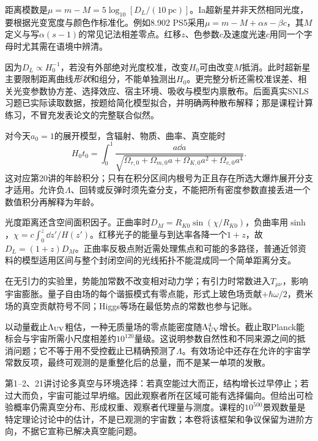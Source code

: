 距离模数是$\mu=m-M=5\log_{10}[D_L/(10\ \mathrm{pc})]$。Ia超新星并非天然相同光度，要根据光变宽度与颜色作标准化。例如8.902 PS5采用$\mu=m-M+\alpha s-\beta c$，其$M$定义与写$\alpha(s-1)$的常见记法相差零点。红移$z$、色参数$c$及速度光速$c$用同一个字母时尤其需在语境中辨清。

因为$D_L\propto H_0^{-1}$，若没有外部绝对光度校准，改变$H_0$可由改变$M$抵消。此时超新星主要限制距离曲线\emph{形状}和组分，不能单独测出$H_0$。更完整分析还需校准误差、相关光变参数协方差、选择效应、宿主环境、吸收与模型内禀散布。后面真实SNLS习题已实际读取数据，按题给简化模型拟合，并明确两种散布解释；那是课程计算练习，不冒充发表论文的完整联合似然。

对今天$a_0=1$的展开模型，含辐射、物质、曲率、真空能时
\[
 H_0t_0=\int_0^1\frac{a\dd a}
 {\sqrt{\Omega_{r,0}+\Omega_{m,0}a+\Omega_{K,0}a^2+\Omega_{v,0}a^4}}.
\]
这对应第20讲的年龄积分；只有在积分区间内根号为正且存在所选大爆炸展开分支才适用。允许负$\Lambda$、回转或反弹时须先查分支，不能把所有密度参数直接丢进一个数值积分再解释为年龄。

光度距离还含空间面积因子。正曲率时$D_M=R_{K0}\sin(\chi/R_{K0})$，负曲率用$\sinh$，$\chi=c\int_0^z\dd z'/H(z')$。红移光子的能量与到达率各降一个$1+z$，故$D_L=(1+z)D_M$。正曲率反极点附近需处理焦点和可能的多路径，普通近邻资料的模型适用区间与整个封闭空间的光线拓扑不能混成同一个简单距离分支。

在无引力的实验里，势能加常数不改变相对动力学；有引力时常数进入$T_{\mu\nu}$，影响宇宙膨胀。量子自由场的每个谐振模式有零点能，形式上玻色场贡献$+\hbar\omega/2$，费米场的真空贡献符号不同；Higgs等场在最低势点的常数也参与记账。

以动量截止$\Lambda_{\rm UV}$粗估，一种无质量场的零点能密度随$\Lambda_{\rm UV}^4$增长。截止取Planck能标会与宇宙所需小尺度相差约$10^{120}$量级。这说明参数自然性和不同来源之间的抵消问题；它不等于用不受控截止已精确预测了$\Lambda$。有效场论中还存在允许的宇宙学常数反项，最终可观测的是重整化后的总量，而不是某一单项的发散。

第1--2、21讲讨论多真空与环境选择：若真空能过大而正，结构增长过早停止；若过大而负，宇宙可能过早坍缩。因此观察者所在区域可能有选择偏向。但给出可检验概率仍需真空分布、形成权重、观察者代理量与测度。课程的$10^{500}$景观数量是特定理论讨论中的估计，不是已观测的宇宙数；本卷将该框架和争议保留为进阶方向，不据它宣称已解决真空能问题。
